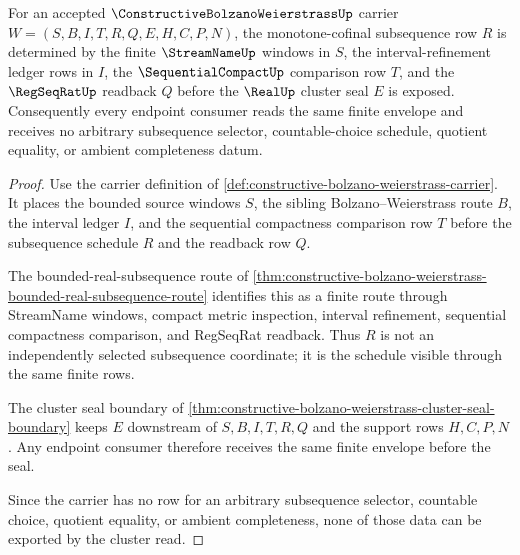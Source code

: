 \begin{theorem}
\label{thm:constructive-bolzano-weierstrass-finite-subsequence-envelope}
For an accepted $\ConstructiveBolzanoWeierstrassUp$ carrier $W=(S,B,I,T,R,Q,E,H,C,P,N)$, the monotone-cofinal subsequence row $R$ is determined by the finite $\StreamNameUp$ windows in $S$, the interval-refinement ledger rows in $I$, the $\SequentialCompactUp$ comparison row $T$, and the $\RegSeqRatUp$ readback $Q$ before the $\RealUp$ cluster seal $E$ is exposed. Consequently every endpoint consumer reads the same finite envelope and receives no arbitrary subsequence selector, countable-choice schedule, quotient equality, or ambient completeness datum.
\end{theorem}
\begin{proof}
Use the carrier definition of \autoref{def:constructive-bolzano-weierstrass-carrier}. It places the bounded source windows $S$, the sibling Bolzano--Weierstrass route $B$, the interval ledger $I$, and the sequential compactness comparison row $T$ before the subsequence schedule $R$ and the readback row $Q$.

The bounded-real-subsequence route of \autoref{thm:constructive-bolzano-weierstrass-bounded-real-subsequence-route} identifies this as a finite route through StreamName windows, compact metric inspection, interval refinement, sequential compactness comparison, and RegSeqRat readback. Thus $R$ is not an independently selected subsequence coordinate; it is the schedule visible through the same finite rows.

The cluster seal boundary of \autoref{thm:constructive-bolzano-weierstrass-cluster-seal-boundary} keeps $E$ downstream of $S,B,I,T,R,Q$ and the support rows $H,C,P,N$. Any endpoint consumer therefore receives the same finite envelope before the seal.

Since the carrier has no row for an arbitrary subsequence selector, countable choice, quotient equality, or ambient completeness, none of those data can be exported by the cluster read.
\end{proof}


